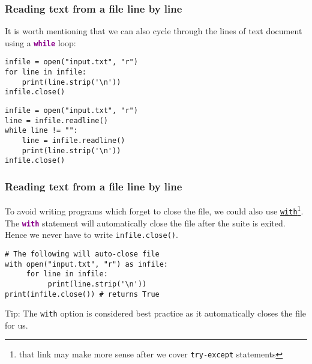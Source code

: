 \documentclass[xcolor=svgnames]{beamer}
\newcommand{\nl}{\\[1em]}
\newcommand{\command}[1]{\texttt{\textbf{\textcolor{DarkMagenta}{#1}}}}
\newcommand{\ft}[1]{\frametitle{#1}}
\begin{document}
%
%
%
%



\begin{frame}[fragile]\ft{Reading text from a file line by line}
It is worth mentioning that we can also cycle through the lines of text document using a \command{while} loop:
\vfill
\begin{Verbatim}[frame=single, label = Using a for loop]
infile = open("input.txt", "r")
for line in infile:
    print(line.strip('\n'))
infile.close()
\end{Verbatim}
\vfill
\begin{Verbatim}[frame=single, label = Using a while loop]
infile = open("input.txt", "r")
line = infile.readline()
while line != "":
    line = infile.readline()
    print(line.strip('\n'))
infile.close()
\end{Verbatim}
\vfill
\end{frame}

\begin{frame}[fragile]\ft{Reading text from a file line by line}
To avoid writing programs which forget to close the file, we could also use \href{https://effbot.org/zone/python-with-statement.htm}{\tt with}\footnote{that link may make more sense after we cover {\tt try-except} statements}.  The \command{with} statement will automatically close the file after the suite is exited.  Hence we never have to write {\tt infile.close()}.\nl
\begin{Verbatim}[xleftmargin=.5in, frame=single]
# The following will auto-close file
with open("input.txt", "r") as infile:
     for line in infile:
          print(line.strip('\n'))
print(infile.close()) # returns True
\end{Verbatim}
\begin{block}{Tip:}
The {\tt with} option is considered best practice as it automatically closes the file for us.
\end{block}

\end{frame}
\end{document}
